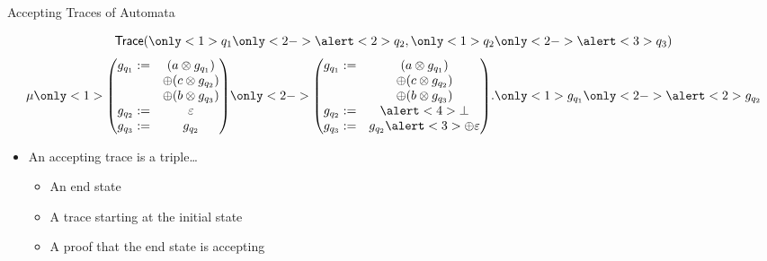 \documentclass[10pt]{beamer}
\begin{document}
\begin{frame}{Accepting Traces of Automata}
    \begin{minipage}{.5\textwidth}
      \[ \mathsf{Trace}(\only<1>{q_{1}}\only<2->{\alert<2> {q_{2}}}, \only<1>{q_{2}}\only<2->{\alert<3>{q_{3}}}) \]
      \begin{equation*}
        \mu
        \only<1>{
        \begin{pmatrix}
          g_{q_{1}} := & (a \otimes g_{q_{1}}) \\ & \oplus  ( c \otimes g_{q_{2}} ) \\ & \oplus (b \otimes g_{q_{3}}) \\
          g_{q_{2}} := & \varepsilon \\
          g_{q_{3}} := & g_{q_{2}} \\
        \end{pmatrix}}\only<2->{
        \begin{pmatrix}
          g_{q_{1}} := & (a \otimes g_{q_{1}}) \\ & \oplus  ( c \otimes g_{q_{2}} ) \\ & \oplus (b \otimes g_{q_{3}}) \\
          g_{q_{2}} := & \alert<4>{\bot} \\
          g_{q_{3}} := & g_{q_{2}} \alert<3>{\oplus \varepsilon} \\
        \end{pmatrix}
        }. \only<1>{g_{q_{1}}}\only<2->{\alert<2>{g_{q_{2}}}}
      \end{equation*}
    \end{minipage}%
    \begin{minipage}{.5\textwidth}
      \begin{itemize}
        \item<6-> An accepting trace is a triple\dots
        \begin{itemize}
          \item<7-> \alert<7>{An end state}
          \item<8-> \alert<8>{A trace starting at the initial state}
          \item<9-> \alert<9>{A proof that the end state is accepting}
        \end{itemize}
      \end{itemize}
    \end{minipage}%
\end{frame}
\end{document}

